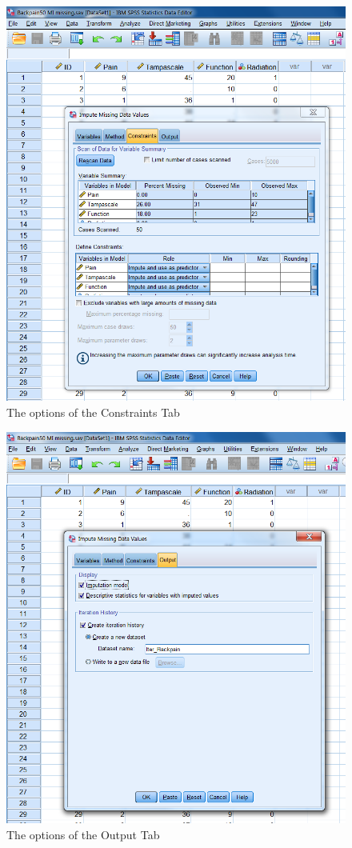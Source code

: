 \documentclass[]{book}
\begin{document}
\begin{figure}

{\centering \includegraphics[width=0.9\linewidth]{images/fig8.3} 

}

\caption{The options of the Constraints Tab}\label{fig:fig8-3}
\end{figure}

\begin{figure}

{\centering \includegraphics[width=0.9\linewidth]{images/fig8.4} 

}

\caption{The options of the Output Tab}\label{fig:fig8-4}
\end{figure}
\end{document}
